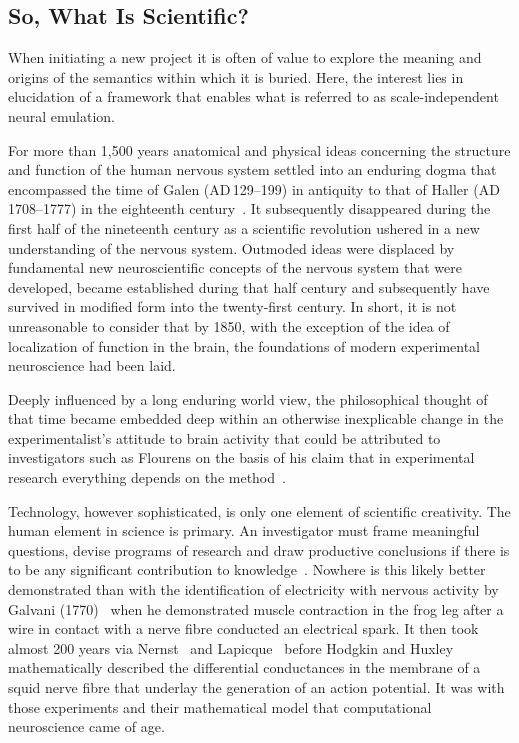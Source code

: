 \documentclass[10pt,letterpaper]{article}
\begin{document}
\subsection*{So, What Is Scientific?}

When initiating a new project it is often of value to explore the meaning and origins of the semantics within which it is buried. Here, the interest lies in elucidation of a framework that enables what is referred to as scale-independent neural emulation.

For more than 1,500 years anatomical and physical ideas concerning the structure and function of the human nervous system settled into an enduring dogma that encompassed the time of Galen ({\small{AD}}\,129--199) in antiquity to that of Haller ({\small{AD}}\,1708--1777) in the eighteenth century~\cite{clarke87}. It subsequently disappeared during the first half of the nineteenth century as a scientific revolution ushered in a new understanding of the nervous system. Outmoded ideas were displaced by fundamental new neuroscientific concepts of the nervous system that were developed, became established during that half century and subsequently have survived in modified form into the twenty-first century. In short, it is not unreasonable to consider that by 1850, with the exception of the idea of localization of function in the brain, the foundations of modern experimental neuroscience had been laid.

Deeply influenced by a long enduring world view, the philosophical thought of that time became embedded deep within an otherwise inexplicable change in the experimentalist's attitude to brain activity that could be attributed to investigators such as Flourens on the basis of his claim that in experimental research everything depends on the method~\cite{flourens24}.

Technology, however sophisticated, is only one element of scientific creativity. The human element in science is primary. An investigator must frame meaningful questions, devise programs of research and draw productive conclusions if there is to be any significant contribution to knowledge~\cite{clarke87}. Nowhere is this likely better demonstrated than with the identification of electricity with nervous activity by Galvani (1770)~\cite{galvani91} when he demonstrated muscle contraction in the frog leg after a wire in contact with a nerve fibre conducted an electrical spark. It then took almost 200 years via Nernst~\cite{nernst89} and Lapicque~\cite{lapicque07} before Hodgkin and Huxley~\cite{hodgkin52e} mathematically described the differential conductances in the membrane of a squid nerve fibre that underlay the generation of an action potential. It was with those experiments and their mathematical model that computational neuroscience came of age.
\end{document}

